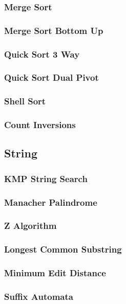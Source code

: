 \documentclass[8pt]{article}
\begin{document}
\subsubsection{Merge Sort}

\subsubsection{Merge Sort Bottom Up}

\subsubsection{Quick Sort 3 Way}

\subsubsection{Quick Sort Dual Pivot}

\subsubsection{Shell Sort}

\subsubsection{Count Inversions}


\subsection{String}
\subsubsection{KMP String Search}

\subsubsection{Manacher Palindrome}

\subsubsection{Z Algorithm}

\subsubsection{Longest Common Substring}

\subsubsection{Minimum Edit Distance}

\subsubsection{Suffix Automata}

\end{document}
